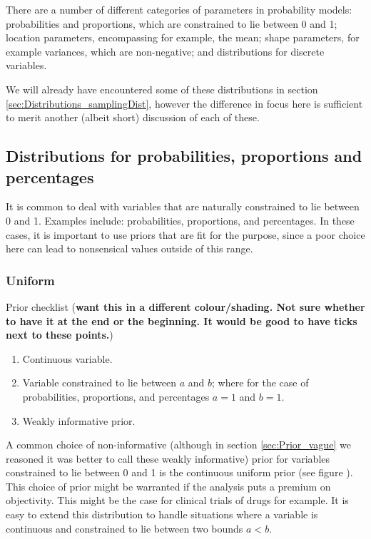 \documentclass[11pt,fullpage]{book}
\begin{document}
There are a number of different categories of parameters in probability models: probabilities and proportions, which are constrained to lie between 0 and 1; location parameters, encompassing for example, the mean; shape parameters, for example variances, which are non-negative; and distributions for discrete variables. 

We will already have encountered some of these distributions in section \ref{sec:Distributions_samplingDist}, however the difference in focus here is sufficient to merit another (albeit short) discussion of each of these.

\subsection{Distributions for probabilities, proportions and percentages}
It is common to deal with variables that are naturally constrained to lie between 0 and 1. Examples include: probabilities, proportions, and percentages. In these cases, it is important to use priors that are fit for the purpose, since a poor choice here can lead to nonsensical values outside of this range.

\subsubsection{Uniform}\label{sec:Distributions_uniform}
Prior checklist (\textbf{want this in a different colour/shading. Not sure whether to have it at the end or the beginning. It would be good to have ticks next to these points.})

\begin{enumerate} 
\item Continuous variable.
\item Variable constrained to lie between $a$ and $b$; where for the case of probabilities, proportions, and percentages $a=1$ and $b=1$.
\item Weakly informative prior.
\end{enumerate}

A common choice of non-informative (although in section \ref{sec:Prior_vague} we reasoned it was better to call these weakly informative) prior for variables constrained to lie between 0 and 1 is the continuous uniform prior (see figure ). This choice of prior might be warranted if the analysis puts a premium on objectivity. This might be the case for clinical trials of drugs for example. It is easy to extend this distribution to handle situations where a variable is continuous and constrained to lie between two bounds $a<b$.
\end{document}
